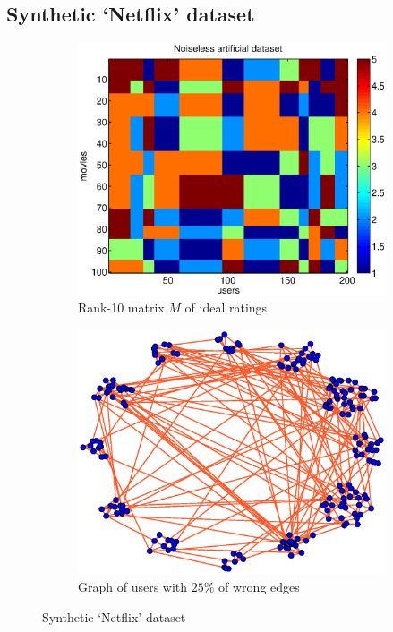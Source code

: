 \documentclass{article}
\begin{document}
\subsection{Synthetic `Netflix' dataset}
\vspace{-0.25cm}
\begin{figure}
\label{fig:artificial_data}
          \begin{subfigure}[b]{.5\linewidth}
            \centering\includegraphics[scale=.28]{noiseless_dataset.eps}
            \vspace{-0.25cm}
            \caption{Rank-10 matrix $M$ of ideal ratings}\label{fig:art_M_noiseless}
          \end{subfigure}
           \begin{subfigure}[b]{.5\linewidth}
            \centering \includegraphics[scale=.28, trim=10 10 40 10, clip=true]{users_graph_25_percent.eps}
            \vspace{-0.25cm}
            \caption{Graph of users with $25\%$ of wrong edges}\label{fig:artificial_G_u}
          \end{subfigure}
        \caption{Synthetic `Netflix' dataset}
	\vspace{-0.25cm}
\end{figure}
\end{document}
